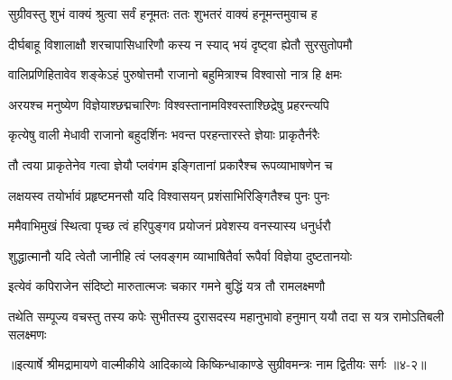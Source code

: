 \twolineshloka
{सुग्रीवस्तु शुभं वाक्यं श्रुत्वा सर्वं हनूमतः}
{ततः शुभतरं वाक्यं हनूमन्तमुवाच ह} %

\twolineshloka
{दीर्घबाहू विशालाक्षौ शरचापासिधारिणौ}
{कस्य न स्याद् भयं दृष्ट्वा ह्येतौ सुरसुतोपमौ} %

\twolineshloka
{वालिप्रणिहितावेव शङ्केऽहं पुरुषोत्तमौ}
{राजानो बहुमित्राश्च विश्वासो नात्र हि क्षमः} %

\twolineshloka
{अरयश्च मनुष्येण विज्ञेयाश्छद्मचारिणः}
{विश्वस्तानामविश्वस्ताश्छिद्रेषु प्रहरन्त्यपि} %

\twolineshloka
{कृत्येषु वाली मेधावी राजानो बहुदर्शिनः}
{भवन्त परहन्तारस्ते ज्ञेयाः प्राकृतैर्नरैः} %

\twolineshloka
{तौ त्वया प्राकृतेनेव गत्वा ज्ञेयौ प्लवंगम}
{इङ्गितानां प्रकारैश्च रूपव्याभाषणेन च} %

\twolineshloka
{लक्षयस्व तयोर्भावं प्रहृष्टमनसौ यदि}
{विश्वासयन् प्रशंसाभिरिङ्गितैश्च पुनः पुनः} %

\twolineshloka
{ममैवाभिमुखं स्थित्वा पृच्छ त्वं हरिपुङ्गव}
{प्रयोजनं प्रवेशस्य वनस्यास्य धनुर्धरौ} %

\twolineshloka
{शुद्धात्मानौ यदि त्वेतौ जानीहि त्वं प्लवङ्गम}
{व्याभाषितैर्वा रूपैर्वा विज्ञेया दुष्टतानयोः} %

\twolineshloka
{इत्येवं कपिराजेन संदिष्टो मारुतात्मजः}
{चकार गमने बुद्धिं यत्र तौ रामलक्ष्मणौ} %

\twolineshloka
{तथेति सम्पूज्य वचस्तु तस्य कपेः सुभीतस्य दुरासदस्य}
{महानुभावो हनुमान् ययौ तदा स यत्र रामोऽतिबली सलक्ष्मणः} %


॥इत्यार्षे श्रीमद्रामायणे वाल्मीकीये आदिकाव्ये किष्किन्धाकाण्डे सुग्रीवमन्त्रः नाम द्वितीयः सर्गः ॥४-२॥
